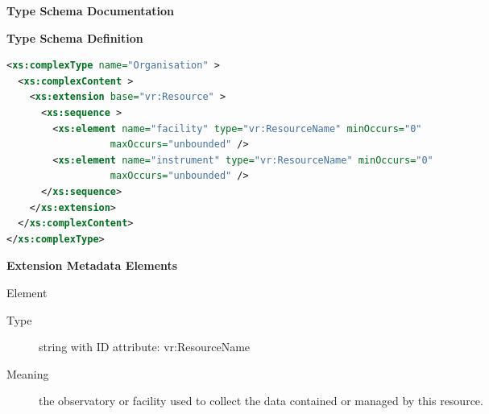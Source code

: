 \documentclass[11pt,a4paper]{ivoa}
\begin{document}
\begin{generated}
\begingroup
        \renewcommand*\descriptionlabel[1]{%
        \hbox to 5.5em{\emph{#1}\hfil}}\vspace{2ex}\noindent\textbf{ Type Schema Documentation}




\vspace{1ex}\noindent\textbf{ Type Schema Definition}

\begin{lstlisting}[language=XML,basicstyle=\footnotesize]
<xs:complexType name="Organisation" >
  <xs:complexContent >
    <xs:extension base="vr:Resource" >
      <xs:sequence >
        <xs:element name="facility" type="vr:ResourceName" minOccurs="0"
                  maxOccurs="unbounded" />
        <xs:element name="instrument" type="vr:ResourceName" minOccurs="0"
                  maxOccurs="unbounded" />
      </xs:sequence>
    </xs:extension>
  </xs:complexContent>
</xs:complexType>
\end{lstlisting}

\vspace{0.5ex}\noindent\textbf{ Extension Metadata Elements}

\begingroup\small\begin{bigdescription}\item[Element \xmlel{facility}]
\begin{description}
\item[Type] string with ID attribute: vr:ResourceName
\item[Meaning]
                       the observatory or facility used to collect the data
                       contained or managed by this resource.


\end{description}
\end{bigdescription}
\end{generated}
\end{document}
